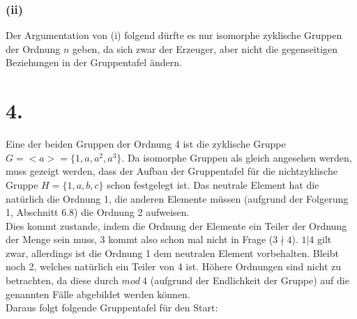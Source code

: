 \documentclass[a4paper]{scrartcl}
\begin{document}
		\subsubsection{(ii)}
			Der Argumentation von (i) folgend dürfte es nur isomorphe zyklische Gruppen der Ordnung 
			\(n\) geben, da sich zwar der Erzeuger, aber nicht die gegenseitigen Beziehungen in der 
			Gruppentafel ändern.
			
\section{4.}
	Eine der beiden Gruppen der Ordnung 4 ist die zyklische Gruppe \(G=<a> =\{1,a,a^2,a^3\}\).
	Da isomorphe Gruppen als gleich angesehen werden, muss gezeigt werden, dass der Aufbau der 
	Gruppentafel für die nichtzyklische Gruppe \(H=\{1,a,b,c\}\) schon festgelegt ist. 
	Das neutrale Element hat die natürlich die Ordnung 1, die anderen Elemente müssen (aufgrund der 	
	Folgerung 1, Abschnitt 6.8) die Ordnung 2 aufweisen.\\ 
	Dies kommt zustande, indem die Ordnung der Elemente ein Teiler der Ordnung der Menge sein muss, 
	3 kommt also schon mal nicht in Frage (\(3\nmid 4\)). \(1|4\) gilt zwar, allerdings ist die 
	Ordnung 1 dem neutralen Element vorbehalten. Bleibt noch 2, welches natürlich ein Teiler von 4 
	ist. Höhere Ordnungen sind nicht zu betrachten, da diese durch \(mod\ 4\) (aufgrund der 
	Endlichkeit der Gruppe) auf die genannten Fälle abgebildet werden können. \\\newpage
	Daraus folgt folgende Gruppentafel für den Start: \\ \\
\end{document}
